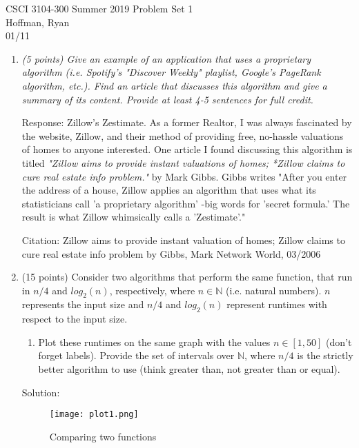 \documentclass[12pt]{article}
\begin{document}
CSCI 3104-300 Summer 2019 \hfill Problem Set 1 \\
Hoffman, Ryan \\
01/11

\hrulefill

\begin{enumerate}

	\item	\textit{(5 points) Give an example of an application that uses a proprietary algorithm (i.e.
	Spotify's "Discover Weekly" playlist, Google's PageRank algorithm, etc.). Find an
	article that discusses this algorithm and give a summary of its content. Provide at
	least 4-5 sentences for full credit.}

	Response: Zillow's Zestimate. As a former Realtor, I was always fascinated by the website, Zillow, and their method 
	of providing free, no-hassle valuations of homes to anyone interested. One article I found discussing 
	this algorithm is titled \textit{"Zillow aims to provide instant valuations of homes; *Zillow claims to cure real estate info problem."}
	by Mark Gibbs. Gibbs writes "After you enter the address of a house, Zillow applies an algorithm that uses what its statisticians call 'a proprietary algorithm' -big words 
	for 'secret formula.' The result is what Zillow whimsically calls a 'Zestimate'."
	
	Citation: 
	Zillow aims to provide instant valuation of homes; Zillow claims to cure real estate info
	problem
	by Gibbs, Mark
	Network World, 03/2006
	
	\newpage
	
	\item (15 points) Consider two algorithms that perform the same function, that run in  $n/4$ and $log_{2}(n)$, respectively, where $n \in \mathbb{N}$ (i.e. natural numbers). $n$ represents the input size and $n/4$ and $log_{2}(n)$ represent runtimes with respect to the input size.

	\begin{enumerate}

	\item \label{stocks:a} Plot these runtimes on the same graph with the values $n \in [1,50]$ (don't forget labels). Provide the set of intervals over $\mathbb{N}$, where $n/4$ is the strictly better algorithm to use (think greater than, not greater than or equal).
	
	\end{enumerate}

	Solution:
	\begin{figure}[!h]
		\centering
		\texttt{[image: plot1.png]}
		\caption{Comparing two functions}
	\end{figure}


\end{enumerate}
\end{document}
